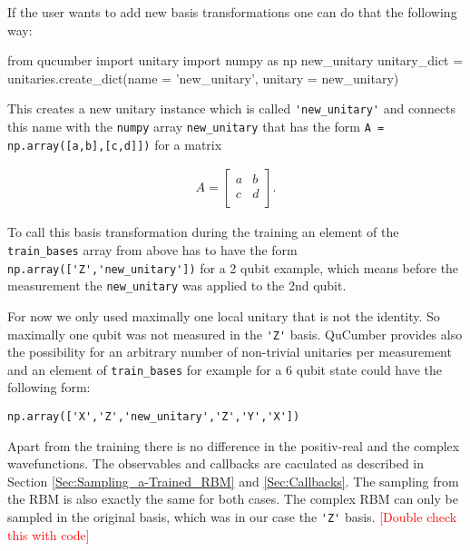 \documentclass[submission, Phys]{SciPost}
\begin{document}
If the user wants to add new basis transformations one can do that the following way:

\begin{python}
from qucumber import unitary
import numpy as np
new_unitary
unitary_dict = unitaries.create_dict(name = 'new_unitary', unitary = new_unitary)
\end{python}

This creates a new unitary instance which is called \verb|'new_unitary'| and connects this name with the \verb|numpy| array 
\verb|new_unitary| that has the form \verb|A = np.array([a,b],[c,d]])| for a matrix 

\begin{align}
A = 
\begin{bmatrix}
a &b \\
c &d \\ 
\end{bmatrix}.
\end{align} 

To call this basis transformation during the training an element of the \verb|train_bases| array from above has to have the form 
\verb|np.array(['Z','new_unitary'])| for a 2 qubit example, which means before the measurement the \verb|new_unitary| was applied to the 2nd qubit.

For now we only used maximally one local unitary that is not the identity. So maximally one qubit was not measured in the \verb|'Z'| basis. QuCumber provides also the possibility for an arbitrary number of non-trivial unitaries per measurement and an element of  \verb|train_bases| for example for a 6 qubit state could have the following form:

\verb|np.array(['X','Z','new_unitary','Z','Y','X'])|

Apart from the training there is no difference in the positiv-real and the complex wavefunctions. The observables and callbacks are caculated as described in Section \ref{Sec:Sampling_a-Trained_RBM} and \ref{Sec:Callbacks}.
The sampling from the RBM is also exactly the same for both cases. The complex RBM can only be sampled in the original basis, which was in our case the \verb|'Z'| basis.
\textcolor{red}{[Double check this with code]}
%
\end{document}
